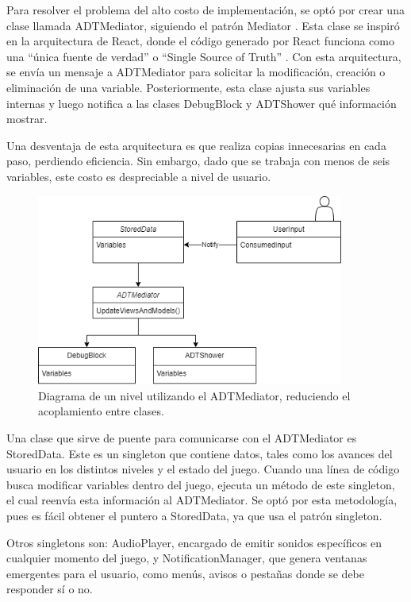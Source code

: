 Para resolver el problema del alto costo de implementación, se optó por crear una clase llamada ADTMediator, siguiendo el patrón Mediator \cite{Freeman2015TheMP}. Esta clase se inspiró en la arquitectura de React, donde el código generado por React funciona como una ``única fuente de verdad'' o ``Single Source of Truth'' \cite{ReactSingleSourceOfTruth}. Con esta arquitectura, se envía un mensaje a ADTMediator para solicitar la modificación, creación o eliminación de una variable. Posteriormente, esta clase ajusta sus variables internas y luego notifica a las clases DebugBlock y ADTShower qué información mostrar.

Una desventaja de esta arquitectura es que realiza copias innecesarias en cada paso, perdiendo eficiencia. Sin embargo, dado que se trabaja con menos de seis variables, este costo es despreciable a nivel de usuario.

\begin{figure}[h!]
	\centering
	\includegraphics[width=0.9\textwidth]{imagenes/ArquitecturaMediatorAfter.png}
	\caption{Diagrama de un nivel utilizando el ADTMediator, reduciendo el acoplamiento entre clases.}
	\label{ArquitecturaMediatorAfter}
\end{figure}

Una clase que sirve de puente para comunicarse con el ADTMediator es StoredData. Este es un singleton que contiene datos, tales como los avances del usuario en los distintos niveles y el estado del juego. Cuando una línea de código busca modificar variables dentro del juego, ejecuta un método de este singleton, el cual reenvía esta información al ADTMediator. Se optó por esta metodología, pues es fácil obtener el puntero a StoredData, ya que usa el patrón singleton.

Otros singletons son: AudioPlayer, encargado de emitir sonidos específicos en cualquier momento del juego, y NotificationManager, que genera ventanas emergentes para el usuario, como menús, avisos o pestañas donde se debe responder sí o no.

